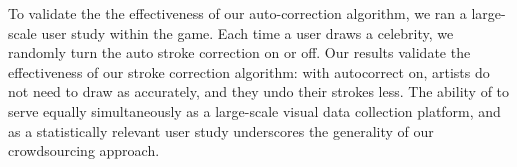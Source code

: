 To validate the the effectiveness of our auto-correction algorithm,
we ran a large-scale user study within the game. Each time a
user draws a celebrity, we randomly turn the auto stroke correction
on or off. Our results validate the effectiveness of our stroke
correction algorithm: with autocorrect on, artists do not need to
draw as accurately, and they undo their strokes less. The ability of
\daf to serve equally simultaneously as a large-scale visual data
collection platform, and as a statistically relevant user study
underscores the generality of our crowdsourcing approach.


% 




%













